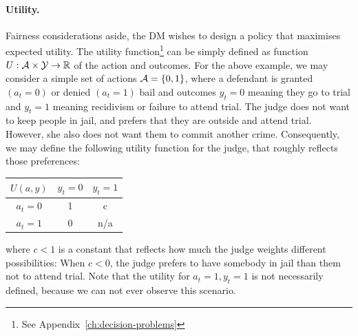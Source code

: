 \begin{frame}
\paragraph{Utility.} Fairness considerations aside, the DM wishes to design a policy that maximises expected utility. The utility function\footnote{See Appendix~\ref{ch:decision-problems}} can be simply defined as function $U : {\mathcal{A}} \times {\mathcal{Y}} \to {\mathbb{R}}$ of the action and outcomes.
  For the above example, we may consider a simple
  set of actions ${\mathcal{A}} = \{0, 1\}$, where a defendant is granted
  $(a_t = 0)$ or denied $(a_t = 1)$ bail and outcomes $y_t = 0$ meaning they go to trial and $y_t = 1$ meaning recidivism or failure to attend trial.
  The judge does not want to keep people in jail, and prefers that they are outside and attend trial. However, she also does not want them to commit another crime.
  Consequently, we may define the following utility function for the
  judge, that roughly reflects those preferences:

  \begin{center}
    \begin{tabular}{c|c|c}
      $U(a, y)$ & $y_t = 0$& $y_t = 1$\\\hline
      $a_t = 0$ &  1  &  c \\
      $a_t = 1$ & 0   &  n/a
    \end{tabular}
  \end{center}
  where $c < 1$ is a constant that reflects how much the judge weights different possibilities: When $c < 0$, the judge prefers to have somebody in jail than them not to attend trial. Note that the utility for $a_t =1, y_t=1$ is not necessarily defined, because we can not ever observe this scenario.
\end{frame}
